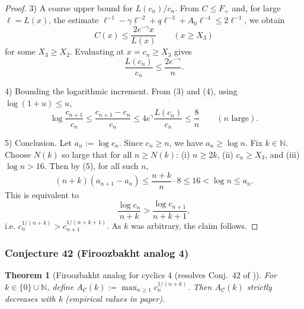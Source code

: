 \documentclass[12pt]{article}
\renewcommand{\tag}[1]{}
\newtheorem{theorem}{Theorem}
\theoremstyle{remark}
\begin{document}
\begin{proof}
3) A coarse upper bound for $L(c_n)/c_n$. From $C\le F_+$ and, for large $\ell=L(x)$, the estimate $\ell^{-1}-\gamma\ell^{-2}+q\ell^{-3}+A_0\ell^{-4}\le 2\ell^{-1}$, we obtain
$$
C(x)\le \frac{2e^{-\gamma}x}{L(x)}\qquad(x\ge X_3)
$$
for some $X_3\ge X_2$. Evaluating at $x=c_n\ge X_3$ gives
$$
\frac{L(c_n)}{c_n}\le \frac{2e^{-\gamma}}{n}.\tag{4}
$$

4) Bounding the logarithmic increment. From (3) and (4), using $\log(1+u)\le u$,
$$
\log\frac{c_{n+1}}{c_n}\le \frac{c_{n+1}-c_n}{c_n}\le 4e^{\gamma}\frac{L(c_n)}{c_n}\le \frac{8}{n}\qquad(n\text{ large}).\tag{5}
$$

5) Conclusion. Let $a_n:=\log c_n$. Since $c_n\ge n$, we have $a_n\ge\log n$. Fix $k\in\mathbb N$. Choose $N(k)$ so large that for all $n\ge N(k)$: (i) $n\ge2k$, (ii) $c_n\ge X_3$, and (iii) $\log n>16$. Then by (5), for all such $n$,
$$
(n+k)(a_{n+1}-a_n)\le \frac{n+k}{n}\cdot 8\le 16<\log n\le a_n.
$$
This is equivalent to
$$
\frac{\log c_n}{n+k}>\frac{\log c_{n+1}}{n+k+1},
$$
i.e. $c_n^{1/(n+k)}>c_{n+1}^{1/(n+k+1)}$. As $k$ was arbitrary, the claim follows. 
\end{proof}


\subsubsection{Conjecture 42 (Firoozbakht analog 4)}
\begin{theorem}[Firoozbakht analog for cyclics 4 (resolves Conj.~42 of \cite{Cohen2025})]\label{thm:firoozbakht_cyclics_4}
For \(k\in\{0\}\cup\mathbb{N}\), define \(A_{\mathcal{C}}(k):=\max_{n\ge1} c_n^{1/(n+k)}\). Then \(A_{\mathcal{C}}(k)\) strictly decreases with k (empirical values in paper).
\end{theorem}
\end{document}
